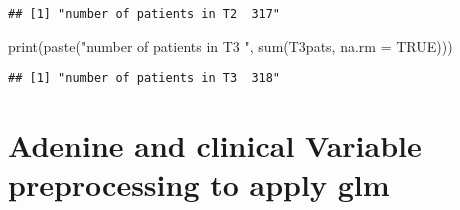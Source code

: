 \documentclass[
]{article}
\newenvironment{Shaded}{\begin{snugshade}}{\end{snugshade}}
\newcommand{\AttributeTok}[1]{\textcolor[rgb]{0.77,0.63,0.00}{#1}}
\newcommand{\CommentTok}[1]{\textcolor[rgb]{0.56,0.35,0.01}{\textit{#1}}}
\newcommand{\ConstantTok}[1]{\textcolor[rgb]{0.00,0.00,0.00}{#1}}
\newcommand{\ControlFlowTok}[1]{\textcolor[rgb]{0.13,0.29,0.53}{\textbf{#1}}}
\newcommand{\DecValTok}[1]{\textcolor[rgb]{0.00,0.00,0.81}{#1}}
\newcommand{\FunctionTok}[1]{\textcolor[rgb]{0.00,0.00,0.00}{#1}}
\newcommand{\NormalTok}[1]{#1}
\newcommand{\OtherTok}[1]{\textcolor[rgb]{0.56,0.35,0.01}{#1}}
\newcommand{\SpecialCharTok}[1]{\textcolor[rgb]{0.00,0.00,0.00}{#1}}
\newcommand{\StringTok}[1]{\textcolor[rgb]{0.31,0.60,0.02}{#1}}
\begin{document}
\begin{verbatim}
## [1] "number of patients in T2  317"
\end{verbatim}

\begin{Shaded}
\begin{Highlighting}[]
\FunctionTok{print}\NormalTok{(}\FunctionTok{paste}\NormalTok{(}\StringTok{"number of patients in T3 "}\NormalTok{, }\FunctionTok{sum}\NormalTok{(T3pats, }\AttributeTok{na.rm =} \ConstantTok{TRUE}\NormalTok{)))}
\end{Highlighting}
\end{Shaded}

\begin{verbatim}
## [1] "number of patients in T3  318"
\end{verbatim}

\begin{Shaded}
\end{Shaded}

\hypertarget{adenine-and-clinical-variable-preprocessing-to-apply-glm}{%
\section{Adenine and clinical Variable preprocessing to apply
glm}\label{adenine-and-clinical-variable-preprocessing-to-apply-glm}}
\end{document}
